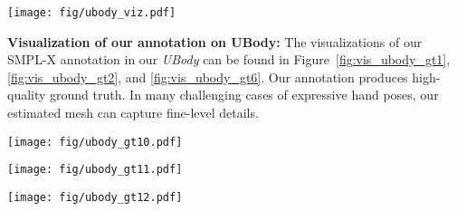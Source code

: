 \documentclass[10pt,twocolumn,letterpaper]{article}
\newcommand{\dataname}{\emph{UBody}\xspace}
\begin{document}
\begin{figure*}[h]
\begin{center}
\texttt{[image: fig/ubody\_viz.pdf]}
\end{center}
\vspace{-0.6cm}
\caption{
Comparisons of existing 3D whole-body estimation methods on our proposed \dataname.
}
\label{fig:vis_ubody}
\end{figure*}


\noindent\textbf{Visualization of our annotation on UBody:} 
The visualizations of our SMPL-X annotation in our \dataname can be found in Figure~\ref{fig:vis_ubody_gt1}, \ref{fig:vis_ubody_gt2}, and \ref{fig:vis_ubody_gt6}. Our annotation produces high-quality ground truth. In many challenging cases of expressive hand poses, our estimated mesh can capture fine-level details.  

\begin{figure*}[h]
\begin{center}
\texttt{[image: fig/ubody\_gt10.pdf]}
\end{center}
\vspace{-0.6cm}
\caption{
Illustration of the ground-truth SMPL-X annotation for the eight scenes in \dataname. For each scene, we show the input image (the upper) and our annotation (the lower).
}
\label{fig:vis_ubody_gt1}
\end{figure*}

\begin{figure*}[h]
\begin{center}
\texttt{[image: fig/ubody\_gt11.pdf]}
\end{center}
\vspace{-0.6cm}
\caption{
Illustration of the ground-truth SMPL-X annotation for seven other scenes in \dataname. For each scene, we show the input image (the upper) and our annotation (the lower).
}
\label{fig:vis_ubody_gt2}
\end{figure*}







\begin{figure*}[h]
\begin{center}
\texttt{[image: fig/ubody\_gt12.pdf]}
\end{center}
\vspace{-0.6cm}
\caption{
Illustration of the ground-truth SMPL-X annotation for some special cases: \emph{multi-person scenes} and \emph{full body scenes} in \dataname. Our annotation pipeline can still work well on these scenes.
}
\label{fig:vis_ubody_gt6}
\end{figure*}
 
\end{document}
